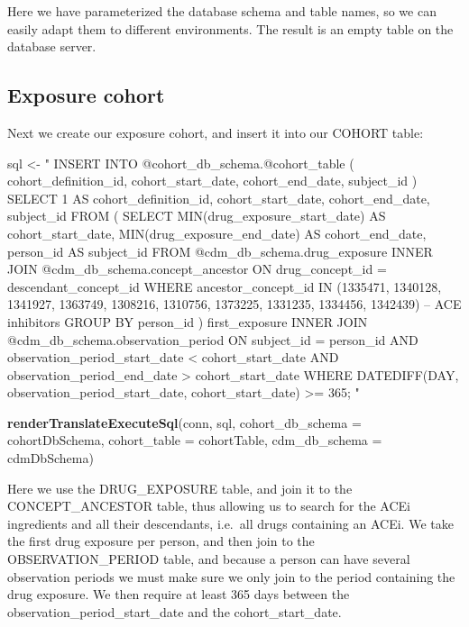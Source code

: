 \documentclass[11pt]{book}
\newenvironment{Shaded}{\begin{snugshade}}{\end{snugshade}}
\newcommand{\DataTypeTok}[1]{\textcolor[rgb]{0.13,0.29,0.53}{#1}}
\newcommand{\KeywordTok}[1]{\textcolor[rgb]{0.13,0.29,0.53}{\textbf{#1}}}
\newcommand{\NormalTok}[1]{#1}
\newcommand{\StringTok}[1]{\textcolor[rgb]{0.31,0.60,0.02}{#1}}
\theoremstyle{definition}
\theoremstyle{definition}
\theoremstyle{definition}
\theoremstyle{remark}
\begin{document}
Here we have parameterized the database schema and table names, so we can easily adapt them to different environments. The result is an empty table on the database server.

\hypertarget{exposure-cohort}{%
\subsection{Exposure cohort}\label{exposure-cohort}}

Next we create our exposure cohort, and insert it into our COHORT table:

\begin{Shaded}
\begin{Highlighting}[]
\NormalTok{sql <-}\StringTok{ "}
\StringTok{INSERT INTO @cohort_db_schema.@cohort_table (}
\StringTok{  cohort_definition_id,}
\StringTok{  cohort_start_date,}
\StringTok{  cohort_end_date,}
\StringTok{  subject_id}
\StringTok{)}
\StringTok{SELECT 1 AS cohort_definition_id,}
\StringTok{  cohort_start_date,}
\StringTok{  cohort_end_date,}
\StringTok{  subject_id}
\StringTok{FROM (}
\StringTok{  SELECT MIN(drug_exposure_start_date) AS cohort_start_date,}
\StringTok{    MIN(drug_exposure_end_date) AS cohort_end_date,}
\StringTok{    person_id AS subject_id}
\StringTok{  FROM @cdm_db_schema.drug_exposure}
\StringTok{  INNER JOIN @cdm_db_schema.concept_ancestor}
\StringTok{    ON drug_concept_id = descendant_concept_id}
\StringTok{  WHERE ancestor_concept_id IN (1335471, 1340128, 1341927,}
\StringTok{    1363749, 1308216, 1310756, 1373225, 1331235, 1334456,}
\StringTok{    1342439) -- ACE inhibitors}
\StringTok{  GROUP BY person_id}
\StringTok{) first_exposure}
\StringTok{INNER JOIN @cdm_db_schema.observation_period}
\StringTok{  ON subject_id = person_id}
\StringTok{    AND observation_period_start_date < cohort_start_date}
\StringTok{    AND observation_period_end_date > cohort_start_date}
\StringTok{WHERE DATEDIFF(DAY,}
\StringTok{               observation_period_start_date,}
\StringTok{               cohort_start_date) >= 365;}
\StringTok{"}

\KeywordTok{renderTranslateExecuteSql}\NormalTok{(conn, sql,}
                          \DataTypeTok{cohort_db_schema =}\NormalTok{ cohortDbSchema,}
                          \DataTypeTok{cohort_table =}\NormalTok{ cohortTable,}
                          \DataTypeTok{cdm_db_schema =}\NormalTok{ cdmDbSchema)}
\end{Highlighting}
\end{Shaded}

Here we use the DRUG\_EXPOSURE table, and join it to the CONCEPT\_ANCESTOR table, thus allowing us to search for the ACEi ingredients and all their descendants, i.e.~all drugs containing an ACEi. We take the first drug exposure per person, and then join to the OBSERVATION\_PERIOD table, and because a person can have several observation periods we must make sure we only join to the period containing the drug exposure. We then require at least 365 days between the observation\_period\_start\_date and the cohort\_start\_date.
\end{document}

